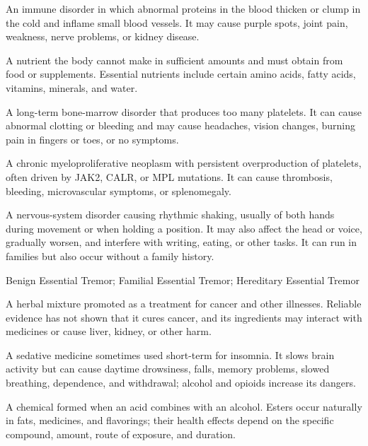  An immune disorder in which abnormal proteins in the blood thicken or clump in the cold and inflame small blood vessels. It may cause purple spots, joint pain, weakness, nerve problems, or kidney disease.

 A nutrient the body cannot make in sufficient amounts and must obtain from food or supplements. Essential nutrients include certain amino acids, fatty acids, vitamins, minerals, and water.

 A long-term bone-marrow disorder that produces too many platelets. It can cause abnormal clotting or bleeding and may cause headaches, vision changes, burning pain in fingers or toes, or no symptoms.

 A chronic myeloproliferative neoplasm with persistent overproduction of platelets, often driven by JAK2, CALR, or MPL mutations. It can cause thrombosis, bleeding, microvascular symptoms, or splenomegaly.

 A nervous-system disorder causing rhythmic shaking, usually of both hands during movement or when holding a position. It may also affect the head or voice, gradually worsen, and interfere with writing, eating, or other tasks. It can run in families but also occur without a family history.

\synonyms
Benign Essential Tremor; Familial Essential Tremor; Hereditary Essential Tremor

 A herbal mixture promoted as a treatment for cancer and other illnesses. Reliable evidence has not shown that it cures cancer, and its ingredients may interact with medicines or cause liver, kidney, or other harm.

 A sedative medicine sometimes used short-term for insomnia. It slows brain activity but can cause daytime drowsiness, falls, memory problems, slowed breathing, dependence, and withdrawal; alcohol and opioids increase its dangers.

 A chemical formed when an acid combines with an alcohol. Esters occur naturally in fats, medicines, and flavorings; their health effects depend on the specific compound, amount, route of exposure, and duration.

